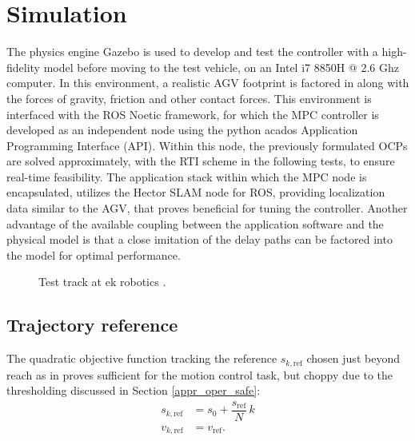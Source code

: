 \section{Simulation}\label{expr_gazebo}
The physics engine Gazebo is used to develop and test the controller with a high-fidelity model before moving to the test vehicle, on an Intel i7 8850H @ 2.6 Ghz computer. In this environment, a realistic \ac{AGV} footprint is factored in along with the forces of gravity, friction and other contact forces.
This environment is interfaced with the \ac{ROS} Noetic framework, for which the \ac{MPC} controller is developed as an independent node using the python acados Application Programming Interface (API). Within this node, the previously formulated OCPs are solved approximately, with the RTI scheme in the following tests, to ensure real-time feasibility.
The application stack within which the \ac{MPC} node is encapsulated, utilizes the Hector \ac{SLAM} node for \ac{ROS}, providing localization data similar to the \ac{AGV}, that proves beneficial for tuning the controller. Another advantage of the available coupling between the application software and the physical model is that a close imitation of the delay paths can be factored into the model for optimal performance.

\begin{figure}[h!tbp]
    \begin{center}
        \def\svgwidth{1.0\textwidth}
        
        \caption{Test track at ek robotics \cite{malitzky_markus_mechanical_nodate}.}
        \label{test_track}
    \end{center}
\end{figure}

\subsection{Trajectory reference}\label{comp_ref}

The quadratic objective function tracking the reference $s_{k, \mathrm{ref}}$ chosen just beyond reach as in \cite{kloeser_nmpc_2020} proves sufficient for the motion control task, but choppy due to the thresholding discussed in Section \ref{appr_oper_safe}:
\begin{align}
    s_{k, \mathrm{ref}} &= s_{0} + \dfrac{s_{\mathrm{ref}}}{N}\,k \label{eq_s_ref}\\
    v_{k, \mathrm{ref}} &= v_{\mathrm{ref}} \label{eq_v_ref}.
\end{align}

